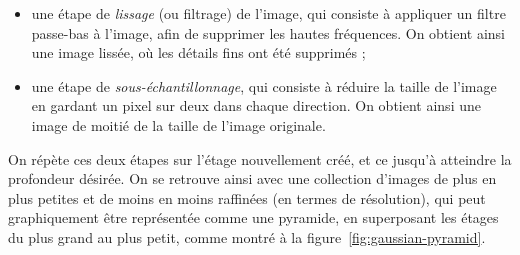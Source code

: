 \bigskip

\begin{itemize}
    \item une étape de \textit{lissage} (ou filtrage) de l'image, qui consiste à appliquer un filtre passe-bas à l'image, afin de supprimer les hautes fréquences. On obtient ainsi une image lissée, où les détails fins ont été supprimés ;
    \item une étape de \textit{sous-échantillonnage}, qui consiste à réduire la taille de l'image en gardant un pixel sur deux dans chaque direction. On obtient ainsi une image de moitié de la taille de l'image originale.
\end{itemize}

On répète ces deux étapes sur l'étage nouvellement créé, et ce jusqu'à atteindre la profondeur désirée. On se retrouve ainsi avec une collection d'images de plus en plus petites et de moins en moins raffinées (en termes de résolution), qui peut graphiquement être représentée comme une pyramide, en superposant les étages du plus grand au plus petit, comme montré à la figure~\ref{fig:gaussian-pyramid}.

